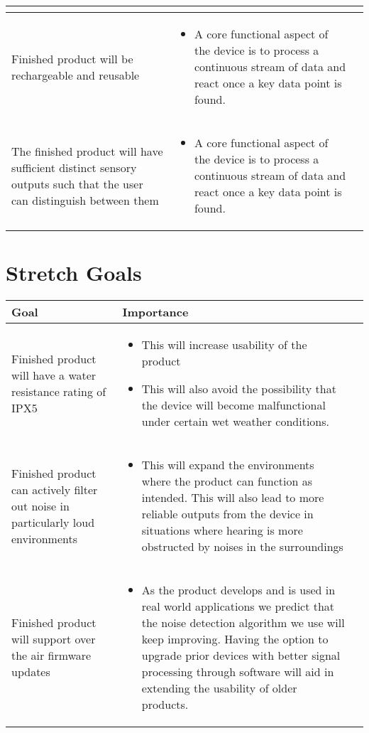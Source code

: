 \documentclass{article}
\begin{document}
\begin{tabularx}{1.3\textwidth} { 
    | >{\raggedright\arraybackslash}X 
    | >{\centering\arraybackslash}X 
    | >{\raggedleft\arraybackslash}X | }
\begin{itemize}
  \end{itemize}   
  \\
   \hline
   Finished product will be rechargeable and reusable &    
   \begin{itemize}
    \item A core functional aspect of the device is to process a continuous stream of data and react once a key data point is found.
  \end{itemize}   
  \\
   \hline
   The finished product will have sufficient distinct sensory outputs such that the user can distinguish between them &    
   \begin{itemize}
    \item A core functional aspect of the device is to process a continuous stream of data and react once a key data point is found.
  \end{itemize}  
   \\
   \hline
  \end{tabularx}

\section{Stretch Goals}
\begin{tabularx}{1.3\textwidth} { 
    | >{\raggedright\arraybackslash}X 
    | >{\centering\arraybackslash}X 
    | >{\raggedleft\arraybackslash}X | }
   \hline
   Goal & Importance \\
   \hline
   Finished product will have a water resistance rating of IPX5 & 
   \begin{itemize}
    \item This will increase usability of the product
    \item This will also avoid the possibility that the device will become malfunctional under certain wet weather conditions.
   \end{itemize} 
   \\
   \hline
   Finished product can actively filter out noise in particularly loud environments   & 
   \begin{itemize}
    \item This will expand the environments where the product can function as intended. This will also lead to more reliable outputs from the device in situations where hearing is more obstructed by noises in the surroundings
   \end{itemize}
   \\
   \hline
   Finished product will support over the air firmware updates & 
   \begin{itemize}
    \item As the product develops and is used in real world applications we predict that the noise detection algorithm we use will keep improving. Having the option to upgrade prior devices with better signal processing through software will aid in extending the usability of older products.
   \end{itemize}
   \\
   \hline
\end{tabularx}
\end{document}
